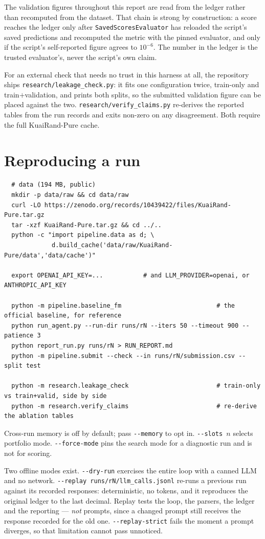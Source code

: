 \documentclass[11pt,a4paper]{article}
\newcommand{\code}[1]{\texttt{#1}}
\newcommand{\file}[1]{\texttt{#1}}
\begin{document}
The validation figures throughout this report are read from the ledger rather than recomputed
from the dataset. That chain is strong by construction: a score reaches the ledger only after
\code{SavedScoresEvaluator} has reloaded the script's saved predictions and recomputed the
metric with the pinned evaluator, and only if the script's self-reported figure agrees to
$10^{-6}$. The number in the ledger is the trusted evaluator's, never the script's own claim.

For an external check that needs no trust in this harness at all, the repository ships
\file{research/leakage\_check.py}: it fits one configuration twice, train-only and
train$+$validation, and prints both splits, so the submitted validation figure can be placed
against the two. \file{research/verify\_claims.py} re-derives the reported tables from the run
records and exits non-zero on any disagreement. Both require the full KuaiRand-Pure cache.

\section{Reproducing a run}

{\footnotesize\begin{verbatim}
  # data (194 MB, public)
  mkdir -p data/raw && cd data/raw
  curl -LO https://zenodo.org/records/10439422/files/KuaiRand-Pure.tar.gz
  tar -xzf KuaiRand-Pure.tar.gz && cd ../..
  python -c "import pipeline.data as d; \
             d.build_cache('data/raw/KuaiRand-Pure/data','data/cache')"

  export OPENAI_API_KEY=...           # and LLM_PROVIDER=openai, or ANTHROPIC_API_KEY

  python -m pipeline.baseline_fm                          # the official baseline, for reference
  python run_agent.py --run-dir runs/rN --iters 50 --timeout 900 --patience 3
  python report_run.py runs/rN > RUN_REPORT.md
  python -m pipeline.submit --check --in runs/rN/submission.csv --split test

  python -m research.leakage_check                        # train-only vs train+valid, side by side
  python -m research.verify_claims                        # re-derive the ablation tables
\end{verbatim}}

\noindent
Cross-run memory is off by default; pass \code{-{}-memory} to opt in. \code{-{}-slots $n$} selects
portfolio mode. \code{-{}-force-mode} pins the search mode for a diagnostic run and is not for
scoring.

\noindent
Two offline modes exist. \code{-{}-dry-run} exercises the entire loop with a canned LLM and no
network. \code{-{}-replay runs/rN/llm\_calls.jsonl} re-runs a previous run against its recorded
responses: deterministic, no tokens, and it reproduces the original ledger to the last decimal.
Replay tests the loop, the parsers, the ledger and the reporting --- \emph{not} prompts, since a
changed prompt still receives the response recorded for the old one.
\code{-{}-replay-strict} fails the moment a prompt diverges, so that limitation cannot pass
unnoticed.
\end{document}
